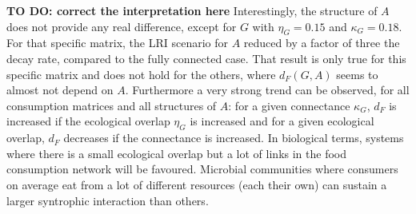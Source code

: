 \documentclass[12pt, titlepage]{report}
\begin{document}
  \textbf{TO DO: correct the interpretation here}
  Interestingly, the structure of $A$ does not provide any real difference, except for $G$ with $\eta_G=0.15$ and $\kappa_G=0.18$. For that specific matrix, the LRI scenario for $A$ reduced by a factor of three the decay rate, compared to the fully connected case. That result is only true for this specific matrix and does not hold for the others, where $d_F(G,A)$ seems to almost not depend on $A$. Furthermore a very strong trend can be observed, for all consumption matrices and all structures of $A$: for a given connectance $\kappa_G$, $d_F$ is increased if the ecological overlap $\eta_G$ is increased and for a given ecological overlap, $d_F$ decreases if the connectance is increased.
  In biological terms, systems where there is a small ecological overlap but a lot of links in the food consumption network will be favoured. Microbial communities where consumers on average eat from a lot of different resources (\ie each their own) can sustain a larger syntrophic interaction than others.

\end{document}
